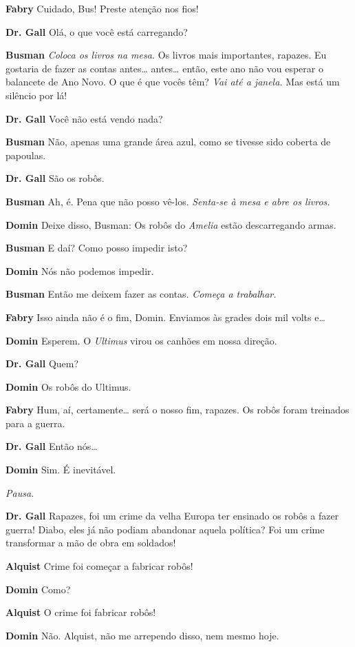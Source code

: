 \textbf{Fabry} Cuidado, Bus! Preste atenção nos fios!

\textbf{Dr. Gall} Olá, o que você está carregando?

\textbf{Busman} \emph{Coloca os livros na mesa.} Os livros mais importantes, rapazes.
Eu gostaria de fazer as contas antes\ldots{} antes\ldots{} então, este ano não vou esperar
o balancete de Ano Novo. O que é que vocês têm? \emph{Vai até a janela.}
Mas está um silêncio por lá!

\textbf{Dr. Gall} Você não está vendo nada?

\textbf{Busman} Não, apenas uma grande área azul, como se tivesse sido coberta de
papoulas.

\textbf{Dr. Gall} São os robôs.

\textbf{Busman} Ah, é. Pena que não posso vê-los. \emph{Senta-se à mesa e abre os
livros.}

\textbf{Domin} Deixe disso, Busman: Os robôs do \textit{Amelia} estão descarregando armas.

\textbf{Busman} E daí? Como posso impedir isto?

\textbf{Domin} Nós não podemos impedir.

\textbf{Busman} Então me deixem fazer as contas. \emph{Começa a trabalhar.}

\textbf{Fabry} Isso ainda não é o fim, Domin. Enviamos às grades dois mil volts e\ldots{}

\textbf{Domin} Esperem. O \textit{Ultimus} virou os canhões em nossa direção.

\textbf{Dr. Gall} Quem?

\textbf{Domin} Os robôs do Ultimus.

\textbf{Fabry} Hum, aí, certamente\ldots{} será o nosso fim, rapazes. Os robôs foram
treinados para a guerra.

\textbf{Dr. Gall} Então nós\ldots{}

\textbf{Domin} Sim. É inevitável.

\emph{Pausa.}

\textbf{Dr. Gall} Rapazes, foi um crime da velha Europa ter ensinado os robôs a fazer
guerra! Diabo, eles já não podiam abandonar aquela política? Foi um crime
transformar a mão de obra em soldados!

\textbf{Alquist} Crime foi começar a fabricar robôs!

\textbf{Domin} Como?

\textbf{Alquist} O crime foi fabricar robôs!

\textbf{Domin} Não. Alquist, não me arrependo disso, nem mesmo hoje.

